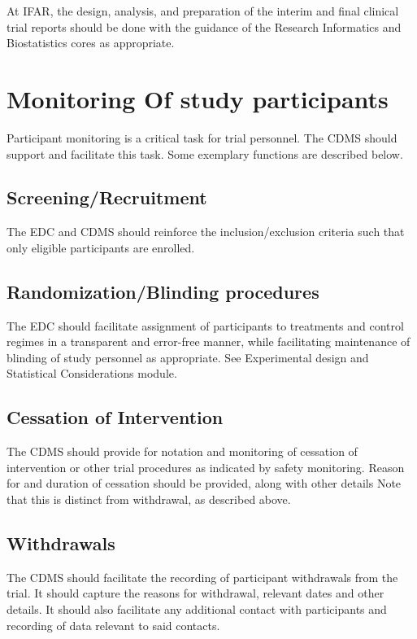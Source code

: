 \documentclass[]{book}
\begin{document}
At IFAR, the design, analysis, and preparation of the interim and final
clinical trial reports should be done with the guidance of the Research
Informatics and Biostatistics cores as appropriate.

\section{Monitoring Of study
participants}\label{monitoring-of-study-participants}

Participant monitoring is a critical task for trial personnel. The CDMS
should support and facilitate this task. Some exemplary functions are
described below.

\subsection{Screening/Recruitment}\label{screeningrecruitment}

The EDC and CDMS should reinforce the inclusion/exclusion criteria such
that only eligible participants are enrolled.

\subsection{Randomization/Blinding
procedures}\label{randomizationblinding-procedures}

The EDC should facilitate assignment of participants to treatments and
control regimes in a transparent and error-free manner, while
facilitating maintenance of blinding of study personnel as appropriate.
See Experimental design and Statistical Considerations module.

\subsection{Cessation of Intervention}\label{cessation-of-intervention}

The CDMS should provide for notation and monitoring of cessation of
intervention or other trial procedures as indicated by safety
monitoring. Reason for and duration of cessation should be provided,
along with other details Note that this is distinct from withdrawal, as
described above.

\subsection{Withdrawals}\label{withdrawals}

The CDMS should facilitate the recording of participant withdrawals from
the trial. It should capture the reasons for withdrawal, relevant dates
and other details. It should also facilitate any additional contact with
participants and recording of data relevant to said contacts.
\end{document}
